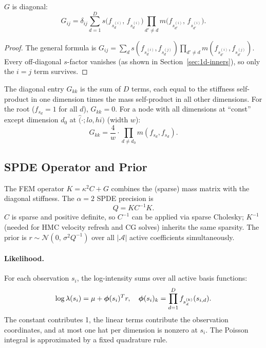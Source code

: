 \documentclass[11pt]{article}
\begin{document}
\begin{proposition}
\label{prop:stiffness-new}
$G$ is diagonal:
\begin{equation}
  G_{ij} = \delta_{ij}
    \sum_{d=1}^D s\!\bigl(f_{s_d^{(i)}},\, f_{s_d^{(i)}}\bigr)
    \prod_{d' \neq d} m\!\bigl(f_{s_{d'}^{(i)}},\, f_{s_{d'}^{(i)}}\bigr).
  \label{eq:hat-stiffness-new}
\end{equation}
\end{proposition}
\begin{proof}
The general formula is $G_{ij} = \sum_d s(f_{s_d^{(i)}},f_{s_d^{(j)}})
\prod_{d'\neq d}m(f_{s_{d'}^{(i)}},f_{s_{d'}^{(j)}})$.  Every off-diagonal
$s$-factor vanishes (as shown in Section~\ref{sec:1d-inners}), so only the
$i=j$ term survives.
\end{proof}

\noindent
The diagonal entry $G_{kk}$ is the sum of $D$ terms, each equal to the
stiffness self-product in one dimension times the mass self-product in
all other dimensions.  For the root ($f_{s_d} = 1$ for all $d$), $G_{kk}=0$.
For a node with all dimensions at ``const'' except dimension $d_0$ at
$\hat(\cdot;lo,hi)$ (width $w$):
\begin{equation}
  G_{kk} = \frac{4}{w} \cdot \prod_{d \neq d_0} m(f_{s_d},f_{s_d}).
  \label{eq:Gkk-example}
\end{equation}

\subsection{SPDE Operator and Prior}
\label{sec:hat-spde}

The FEM operator $K = \kappa^2 C + G$ combines the (sparse) mass matrix with
the diagonal stiffness.  The $\alpha=2$ SPDE precision is
\begin{equation}
  Q = K C^{-1} K.
  \label{eq:hat-Q-new}
\end{equation}
$C$ is sparse and positive definite, so $C^{-1}$ can be applied via sparse
Cholesky; $K^{-1}$ (needed for HMC velocity refresh and CG solves) inherits
the same sparsity.  The prior is $r \sim \mathcal{N}(0,\,\sigma^2 Q^{-1})$
over all $|\mathcal{A}|$ active coefficients simultaneously.

\paragraph{Likelihood.}
For each observation $s_i$, the log-intensity sums over all active basis
functions:
\begin{equation}
  \log\lambda(s_i) = \mu + \boldsymbol{\phi}(s_i)^T r,
  \quad
  \boldsymbol{\phi}(s_i)_k = \prod_{d=1}^D f_{s_d^{(k)}}(s_{i,d}).
  \label{eq:hat-loglik-new}
\end{equation}
The constant contributes 1, the linear terms contribute the observation
coordinates, and at most one hat per dimension is nonzero at $s_i$.
The Poisson integral is approximated by a fixed quadrature rule.
\end{document}
